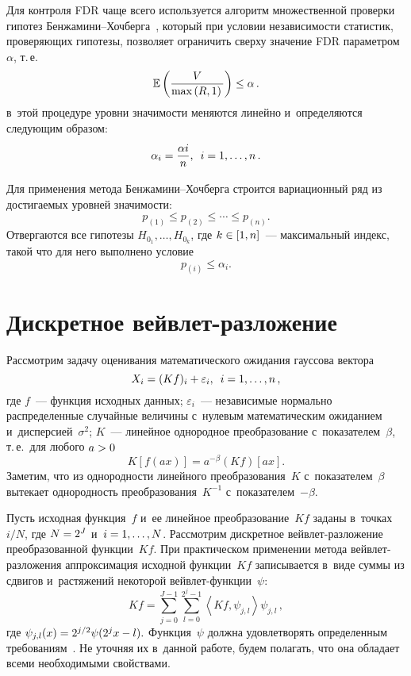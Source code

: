 \begin{multicols}{2}
Для контроля FDR чаще всего используется алгоритм множественной проверки гипотез 
Бен\-жа\-ми\-ни--Хоч\-бер\-га~\cite{Benjamini-Hochberg}, который при условии независимости 
статистик, проверяющих гипотезы, позволяет ограничить сверху значение FDR 
па\-ра\-мет\-ром~$\alpha$, т.\,е. 
$$
\mathbb{E}\left(\displaystyle\frac{\displaystyle V\mathstrut}{\displaystyle \max\left(R,1\right)\mathstrut}\right) \le \alpha\,.
$$ в~этой процедуре уровни значимости меняются линейно и~определяются 
следующим образом: 
$$
\alpha_i = \displaystyle\frac{\displaystyle \alpha  i\mathstrut}{\displaystyle n\mathstrut},\enskip i = 1,\ldots,n\,.
$$

Для применения метода Бен\-жа\-ми\-ни--Хоч\-бер\-га строится вариационный ряд из 
достигаемых уровней значимости:
$$
p_{(1)} \le p_{(2)} \le \cdots \le p_{(n)}.
$$
Отвергаются все гипотезы $H_{0_1}, \ldots, H_{0_k}$, где $k \hm\in [1,n]$~--- 
максимальный индекс, такой что для него выполнено условие
\begin{equation*}
p_{(i)} \le \alpha_i.
\end{equation*}

\section{Дискретное вейвлет-разложение}

Рассмотрим задачу оценивания математического ожидания гауссова вектора
\begin{equation*}
\label{data_model}
X_i=(Kf)_i+\varepsilon_i,\enskip i=1,\ldots,n\,,
\end{equation*}
где $f$~--- функция исходных данных; $\varepsilon_i$~--- независимые нормально 
распределенные случайные величины с~нулевым математическим ожиданием 
и~дисперсией~$\sigma^2$; $K$~--- линейное однородное \mbox{преобразование} с~показателем~$\beta$, 
т.\,е.\ для любого $a\hm>0$
$$
K[f(ax)] = a^{-\beta}(Kf)[a x].
$$
Заметим, что из однородности линейного преобразования~$K$ с~показателем~$\beta$ 
вытекает однородность преобразования~$K^{-1}$ с~показателем~$-\beta$.

Пусть исходная функция~$f$ и~ее линейное преобразование~$Kf$ заданы в~точках~$i/N$, 
где $N\hm=2^J$ и~$i\hm=1,\ldots,N$. Рассмотрим дискретное вейв\-лет-раз\-ло\-же\-ние 
преобразованной функции~$Kf$. При практическом применении метода вейв\-лет-раз\-ло\-же\-ния 
аппроксимация исходной функции~$Kf$ записывается в~виде суммы из 
сдвигов и~растяжений некоторой вейв\-лет-функ\-ции~$\psi$:
$$
Kf = \sum\limits_{j=0}^{J-1}\sum\limits_{l=0}^{2^j-1}\left\langle Kf, \psi_{j,l}\right\rangle \psi_{j,l}\,,
$$
где $\psi_{j,l}(x) \hm= 2^{j/2}\psi(2^jx-l).$ Функция~$\psi$ должна удовлетворять 
определенным требованиям~\cite{Mallat}. Не уточняя их в~данной работе, будем 
полагать, что она обладает всеми необходимыми свойствами.


\end{multicols}
